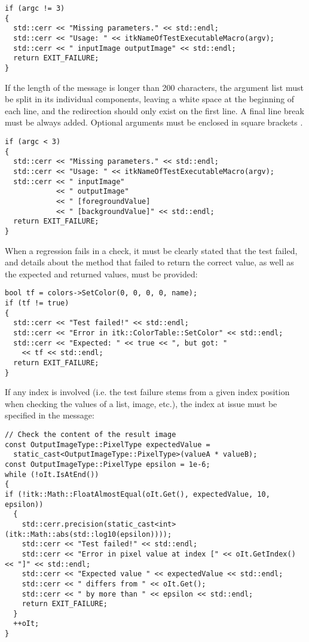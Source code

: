 \small
\begin{verbatim}
if (argc != 3)
{
  std::cerr << "Missing parameters." << std::endl;
  std::cerr << "Usage: " << itkNameOfTestExecutableMacro(argv);
  std::cerr << " inputImage outputImage" << std::endl;
  return EXIT_FAILURE;
}
\end{verbatim}
\normalsize

If the length of the message is longer than 200 characters, the argument list
must be split in its individual components, leaving a white space at the
beginning of each line, and the  redirection should only
exist on the first line. A final line break must be always added. Optional
arguments must be enclosed in square brackets \code{[]}.

\small
\begin{verbatim}
if (argc < 3)
{
  std::cerr << "Missing parameters." << std::endl;
  std::cerr << "Usage: " << itkNameOfTestExecutableMacro(argv);
  std::cerr << " inputImage"
            << " outputImage"
            << " [foregroundValue]
            << " [backgroundValue]" << std::endl;
  return EXIT_FAILURE;
}
\end{verbatim}
\normalsize

When a regression fails in a check, it must be clearly stated that the test
failed, and details about the method that failed to return the correct value,
as well as the expected and returned values, must be provided:

\small
\begin{verbatim}
bool tf = colors->SetColor(0, 0, 0, 0, name);
if (tf != true)
{
  std::cerr << "Test failed!" << std::endl;
  std::cerr << "Error in itk::ColorTable::SetColor" << std::endl;
  std::cerr << "Expected: " << true << ", but got: "
    << tf << std::endl;
  return EXIT_FAILURE;
}
\end{verbatim}
\normalsize

If any index is involved (i.e. the test failure stems from a given index
position when checking the values of a list, image, etc.), the index at issue
must be specified in the message:

\small
\begin{verbatim}
// Check the content of the result image
const OutputImageType::PixelType expectedValue =
  static_cast<OutputImageType::PixelType>(valueA * valueB);
const OutputImageType::PixelType epsilon = 1e-6;
while (!oIt.IsAtEnd())
{
if (!itk::Math::FloatAlmostEqual(oIt.Get(), expectedValue, 10, epsilon))
  {
    std::cerr.precision(static_cast<int>(itk::Math::abs(std::log10(epsilon))));
    std::cerr << "Test failed!" << std::endl;
    std::cerr << "Error in pixel value at index [" << oIt.GetIndex() << "]" << std::endl;
    std::cerr << "Expected value " << expectedValue << std::endl;
    std::cerr << " differs from " << oIt.Get();
    std::cerr << " by more than " << epsilon << std::endl;
    return EXIT_FAILURE;
  }
  ++oIt;
}
\end{verbatim}
\normalsize


